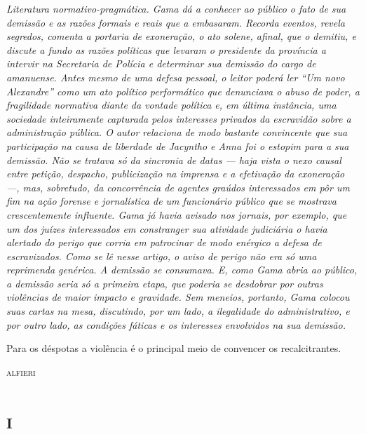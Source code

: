 \begin{didascalia}\itshape
Literatura normativo-pragmática. Gama dá a conhecer ao público o fato de
sua demissão e as razões formais e reais que a embasaram. Recorda
eventos, revela segredos, comenta a portaria de exoneração, o ato
solene, afinal, que o demitiu, e discute a fundo as razões políticas que
levaram o presidente da província a intervir na Secretaria de Polícia e
determinar sua demissão do cargo de amanuense. Antes mesmo de uma defesa
pessoal, o leitor poderá ler ``Um novo Alexandre'' como um ato
político performático que denunciava o abuso de poder, a fragilidade
normativa diante da vontade política e, em última instância, uma
sociedade inteiramente capturada pelos interesses privados da escravidão
sobre a administração pública. O autor relaciona de modo bastante
convincente que sua participação na causa de liberdade de Jacyntho e
Anna foi o estopim para a sua demissão. Não se tratava só da sincronia
de datas --- haja vista o nexo causal entre petição, despacho,
publicização na imprensa e a efetivação da exoneração ---, mas,
sobretudo, da concorrência de agentes graúdos interessados em pôr um fim
na ação forense e jornalística de um funcionário público que se mostrava
crescentemente influente. Gama já havia avisado nos jornais, por
exemplo, que um dos juízes interessados em constranger sua atividade
judiciária o havia alertado do perigo que corria em patrocinar de modo
enérgico a defesa de escravizados. Como se lê nesse artigo, o aviso de
perigo não era só uma reprimenda genérica. A demissão se consumava. E,
como Gama abria ao público, a demissão seria só a primeira etapa, que
poderia se desdobrar por outras violências de maior impacto e gravidade.
Sem meneios, portanto, Gama colocou suas cartas na mesa, discutindo, por
um lado, a ilegalidade do administrativo, e por outro lado, as condições
fáticas e os interesses envolvidos na sua demissão.
\end{didascalia}

\pagebreak

\epigraph{Para os déspotas a violência é o principal meio de convencer os
recalcitrantes.}{\textsc{alfieri}\footnotemark}


\section{\textsc{i}}

